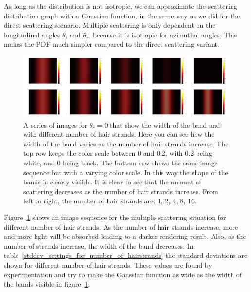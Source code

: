 \documentclass[11pt,a4paper]{report}
\begin{document}
As long as the distribution is not isotropic, we can approximate the scattering distribution graph with a Gaussian function, in the same way as we did for the direct scattering scenario. Multiple scattering is only dependent on the longitudinal angles $\theta_i$ and $\theta_r$, because it is isotropic for azimuthal angles. This makes the PDF much simpler compared to the direct scattering variant.


\begin{figure}[h]
\begin{center}

\includegraphics[scale=0.06]{images/scatteringdistribution/multiplescattering_bandwidth_lowres.jpg}

\caption{A series of images for $\theta_r = 0$ that show the width of the band  and with different number of hair strands. Here you can see how the width of the band varies as the number of hair strands increase. The top row keeps the color scale between 0 and 0.2, with 0.2 being white, and 0 being black. The bottom row shows the same image sequence but with a varying color scale. In this way the shape of the bands is clearly visible. It is clear to see that the amount of scattering decreases as the number of hair strands increase. From left to right, the number of hair strands are: 1, 2, 4, 8, 16.}
\label{bandwidth}
\end{center}
\end{figure}

Figure~\ref{bandwidth} shows an image sequence for the multiple scattering situation for different number of hair strands. As the number of hair strands increase, more and more light will be absorbed leading to a darker rendering result. Also, as the number of strands increase, the width of the band decreases. In table~\ref{stddev_settings_for_number_of_hairstrands} the standard deviations are shown for different number of hair strands. These values are found by experimentation and try to make the Gaussian function as wide as the width of the bands visible in figure~\ref{bandwidth}.\\
\end{document}
